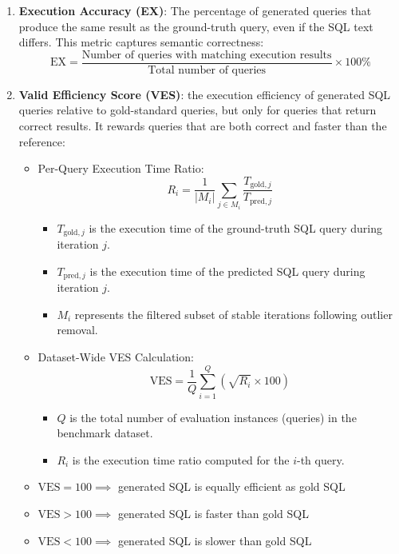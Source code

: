 \begin{enumerate}
    \item \textbf{Execution Accuracy (EX)}: The percentage of generated queries that produce the same result as the ground-truth query, even if the SQL text differs. This metric captures semantic correctness:
    \[\text{EX} = \frac{\text{Number of queries with matching execution results}}{\text{Total number of queries}} \times 100\%\]
    
    \item \textbf{Valid Efficiency Score (VES)}: the execution efficiency of generated SQL queries relative to gold-standard queries, but only for queries that return correct results. It rewards queries that are both correct and faster than the reference:    
    \begin{itemize}
      \item Per-Query Execution Time Ratio:
         \begin{equation}
            R_i = \frac{1}{|M_i|} \sum_{j \in M_i} \frac{T_{\text{gold}, j}}{T_{\text{pred}, j}}
         \end{equation}
         \begin{itemize}
            \item $T_{\text{gold}, j}$ is the execution time of the ground-truth SQL query during iteration $j$.
            \item $T_{\text{pred}, j}$ is the execution time of the predicted SQL query during iteration $j$.
            \item $M_i$ represents the filtered subset of stable iterations following outlier removal.
         \end{itemize}
      \item Dataset-Wide VES Calculation:
         \begin{equation}
            \text{VES} = \frac{1}{Q} \sum_{i=1}^{Q} \left( \sqrt{R_i} \times 100 \right)
         \end{equation}
         \begin{itemize}
            \item $Q$ is the total number of evaluation instances (queries) in the benchmark dataset.
            \item $R_i$ is the execution time ratio computed for the $i$-th query.
         \end{itemize}
        \item $\text{VES} = 100 \implies$ generated SQL is equally efficient as gold SQL
        \item $\text{VES} > 100 \implies$ generated SQL is faster than gold SQL
        \item $\text{VES} < 100 \implies$ generated SQL is slower than gold SQL
   \end{itemize}
\end{enumerate}

